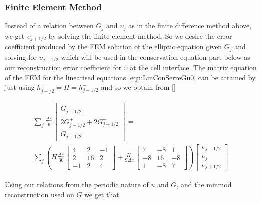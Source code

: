 \documentclass[12pt]{article}
\begin{document}
\subsubsection{Finite Element Method} 
Instead of a relation between $G_j$ and $\upsilon_j$ as in the finite difference method above, we get $\upsilon_{j+1/2}$ by solving the finite element method. So we desire the error coefficient produced by the FEM solution of the elliptic equation given $G_j$ and solving for $\upsilon_{j+1/2}$ which will be used in the conservation equation part below as our reconstruction error coefficient for $\upsilon$ at the cell interface. The matrix equation of the FEM for the linearised equations \eqref{eqn:LinConSerreGu0} can be attained by just using $h^+_{j-/2} = H =h^-_{j+1/2} $ and so we obtain from []

\begin{multline*}
\sum_j \frac{\Delta x}{6}\begin{bmatrix} G^+_{j -1/2} \\2 G^+_{j -1/2}+2 G^-_{j +1/2} \\ G^-_{j +1/2} \end{bmatrix} = \\\sum_j \left(H\frac{\Delta x}{30}\begin{bmatrix} 4 &2 &-1 \\2 &16 &2  \\-1 &2 &4 \end{bmatrix} + \frac{H^3 }{9\Delta x}\begin{bmatrix} 7 &-8 &1  \\-8 &16 &-8  \\1 &-8 &7  \end{bmatrix} \right) \begin{bmatrix} \upsilon_{j -1/2} \\\upsilon_{j} \\ \upsilon_{j +1/2} \end{bmatrix}
\end{multline*}

Using our relations from the periodic nature of $u$ and $G$, and the minmod reconstruction used on $G$ we get that
\end{document}
